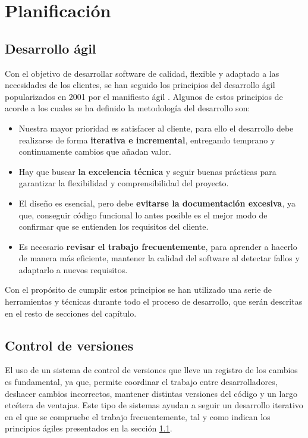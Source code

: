 \chapter{Planificación}
\label{ch:planning}

\section{Desarrollo ágil}
\label{sec:agile}

Con el objetivo de desarrollar software de calidad, flexible y adaptado a las necesidades de los clientes, se han seguido los principios del desarrollo ágil popularizados en 2001 por el manifiesto ágil \cite{beck2001agile}. Algunos de estos principios de acorde a los cuales se ha definido la metodología del desarrollo son:

\begin{itemize}
	\item{Nuestra mayor prioridad es satisfacer al cliente, para ello el desarrollo debe realizarse de forma \textbf{iterativa e incremental}, entregando temprano y continuamente cambios que añadan valor.}
	\item{Hay que buscar \textbf{la excelencia técnica} y seguir buenas prácticas para garantizar la flexibilidad y comprensibilidad del proyecto.}
	\item{El diseño es esencial, pero debe \textbf{evitarse la documentación excesiva}, ya que, conseguir código funcional lo antes posible es el mejor modo de confirmar que se entienden los requisitos del cliente.}
	\item{Es necesario \textbf{revisar el trabajo frecuentemente}, para aprender a hacerlo de manera más eficiente, mantener la calidad del software al detectar fallos y adaptarlo a nuevos requisitos.}
\end{itemize}

Con el propósito de cumplir estos principios se han utilizado una serie de herramientas y técnicas durante todo el proceso de desarrollo, que serán descritas en el resto de secciones del capítulo.

\section{Control de versiones}

El uso de un sistema de control de versiones que lleve un registro de los cambios es fundamental, ya que, permite coordinar el trabajo entre desarrolladores, deshacer cambios incorrectos, mantener distintas versiones del código y un largo etcétera de ventajas. Este tipo de sistemas ayudan a seguir un desarrollo iterativo en el que se compruebe el trabajo frecuentemente, tal y como indican los principios ágiles presentados en la sección \ref{sec:agile}. 


